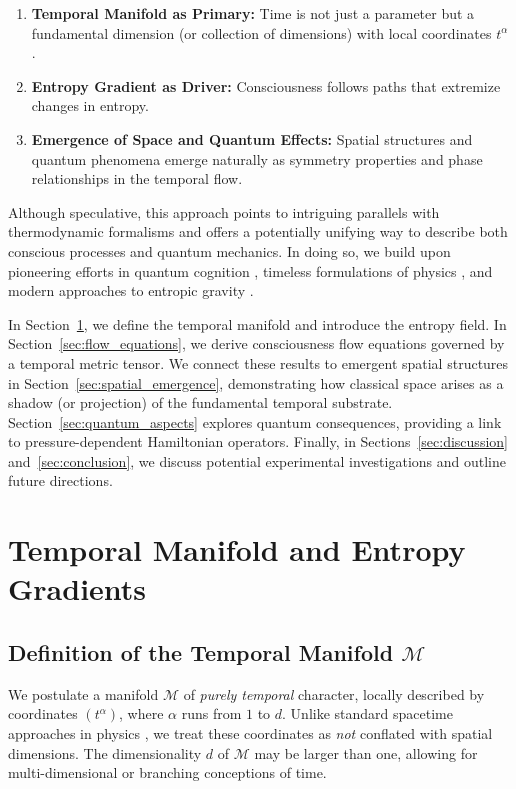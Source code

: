 \documentclass[12pt]{article}
\begin{document}
\begin{enumerate}
    \item \textbf{Temporal Manifold as Primary:} Time is not just a parameter but a fundamental dimension (or collection of dimensions) with local coordinates $t^{\alpha}$.
    \item \textbf{Entropy Gradient as Driver:} Consciousness follows paths that extremize changes in entropy. 
    \item \textbf{Emergence of Space and Quantum Effects:} Spatial structures and quantum phenomena emerge naturally as symmetry properties and phase relationships in the temporal flow.
\end{enumerate}

Although speculative, this approach points to intriguing parallels with thermodynamic formalisms and offers a potentially unifying way to describe both conscious processes and quantum mechanics. In doing so, we build upon pioneering efforts in quantum cognition \cite{bruza2015quantum}, timeless formulations of physics \cite{barbour1999end}, and modern approaches to entropic gravity \cite{verlinde2011origin}. 

In Section~\ref{sec:temporal_manifold}, we define the temporal manifold and introduce the entropy field. In Section~\ref{sec:flow_equations}, we derive consciousness flow equations governed by a temporal metric tensor. We connect these results to emergent spatial structures in Section~\ref{sec:spatial_emergence}, demonstrating how classical space arises as a shadow (or projection) of the fundamental temporal substrate. Section~\ref{sec:quantum_aspects} explores quantum consequences, providing a link to pressure-dependent Hamiltonian operators. Finally, in Sections~\ref{sec:discussion} and~\ref{sec:conclusion}, we discuss potential experimental investigations and outline future directions.

\section{Temporal Manifold and Entropy Gradients}
\label{sec:temporal_manifold}

\subsection{Definition of the Temporal Manifold \texorpdfstring{$\mathcal{M}$}{M}}
We postulate a manifold $\mathcal{M}$ of \emph{purely temporal} character, locally described by coordinates $(t^\alpha)$, where $\alpha$ runs from $1$ to $d$. Unlike standard spacetime approaches in physics \cite{misner1973gravitation}, we treat these coordinates as \emph{not} conflated with spatial dimensions. The dimensionality $d$ of $\mathcal{M}$ may be larger than one, allowing for multi-dimensional or branching conceptions of time.
\end{document}
